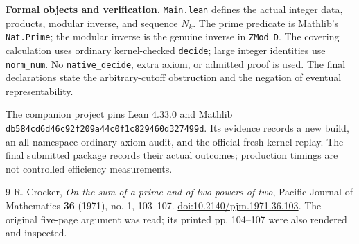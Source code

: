 \documentclass[10pt,a4paper]{article}
\begin{document}
\textbf{Formal objects and verification.}
\texttt{Main.lean} defines the actual integer data, products, modular inverse,
and sequence $N_k$. The prime predicate is Mathlib's \texttt{Nat.Prime};
the modular inverse is the genuine inverse in \texttt{ZMod D}.
The covering calculation uses ordinary kernel-checked \texttt{decide}; large integer
identities use \texttt{norm\_num}. No \texttt{native\_decide}, extra axiom, or admitted
proof is used. The final declarations state the arbitrary-cutoff obstruction
and the negation of eventual representability.

The companion project pins Lean 4.33.0 and Mathlib
\texttt{db584cd6d46c92f209a44c0f1c829460d327499d}.
Its evidence records a new build, an all-namespace ordinary axiom audit, and the
official fresh-kernel replay. The final submitted package records their actual outcomes;
production timings are not controlled efficiency measurements.

\begin{thebibliography}{9}
 R. Crocker, \emph{On the sum of a prime and of two powers of two},
Pacific Journal of Mathematics \textbf{36} (1971), no. 1, 103--107.
\href{https://doi.org/10.2140/pjm.1971.36.103}{doi:10.2140/pjm.1971.36.103}.
The original five-page argument was read; its printed pp. 104--107 were also rendered and inspected.
\end{thebibliography}
\end{document}
